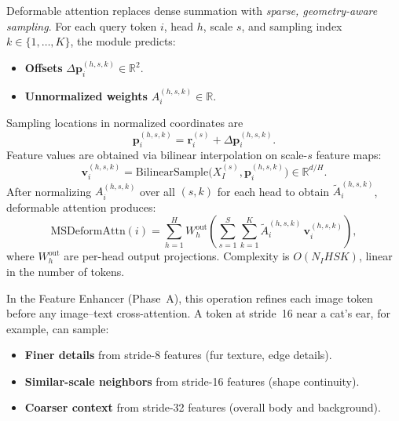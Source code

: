 \begin{enrichment}
\begin{enrichment}[Method][subsection]
		Deformable attention replaces dense summation with \emph{sparse, geometry-aware sampling}. For each query token \(i\), head \(h\), scale \(s\), and sampling index \(k \in \{1,\dots,K\}\), the module predicts:
		\begin{itemize}
			\item \textbf{Offsets} \(\Delta \mathbf{p}_i^{(h,s,k)} \in \mathbb{R}^2\).
			\item \textbf{Unnormalized weights} \(A_i^{(h,s,k)} \in \mathbb{R}\).
		\end{itemize}
		Sampling locations in normalized coordinates are
		\[
		\mathbf{p}_i^{(h,s,k)} = \mathbf{r}_i^{(s)} + \Delta \mathbf{p}_i^{(h,s,k)}.
		\]
		Feature values are obtained via bilinear interpolation on scale-\(s\) feature maps:
		\[
		\mathbf{v}_i^{(h,s,k)} = \text{BilinearSample}\bigl(X_I^{(s)}, \mathbf{p}_i^{(h,s,k)}\bigr) \in \mathbb{R}^{d/H}.
		\]
		After normalizing \(A_i^{(h,s,k)}\) over all \((s,k)\) for each head to obtain \(\tilde{A}_i^{(h,s,k)}\), deformable attention produces:
		\[
		\mathrm{MSDeformAttn}(i) =
		\sum_{h=1}^{H} W_h^{\mathrm{out}}
		\left(
		\sum_{s=1}^{S}
		\sum_{k=1}^{K}
		\tilde{A}_i^{(h,s,k)}\, \mathbf{v}_i^{(h,s,k)}
		\right),
		\]
		where \(W_h^{\mathrm{out}}\) are per-head output projections. Complexity is \(O(N_I H S K)\), linear in the number of tokens.
		
		In the Feature Enhancer (Phase~A), this operation refines each image token before any image--text cross-attention. A token at stride~16 near a cat’s ear, for example, can sample:
		\begin{itemize}
			\item \textbf{Finer details} from stride-8 features (fur texture, edge details).
			\item \textbf{Similar-scale neighbors} from stride-16 features (shape continuity).
			\item \textbf{Coarser context} from stride-32 features (overall body and background).
		\end{itemize}
		

\end{enrichment}
\end{enrichment}
